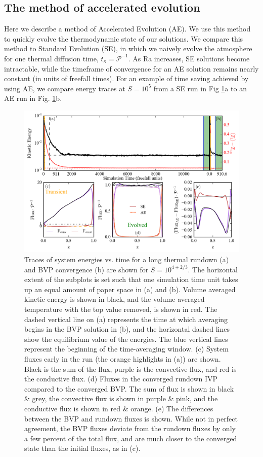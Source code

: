 \documentclass[aps, pre, onecolumn, nofootinbib, notitlepage, groupedaddress, amsfonts, amssymb, amsmath, longbibliography]{revtex4-1}
\begin{document}
\subsection{The method of accelerated evolution}
\label{subsection:ae}
Here we describe a method of Accelerated Evolution (AE). We use this method to quickly evolve the
thermodynamic state of our solutions.  We compare this method to Standard Evolution
(SE), in which we naively evolve the atmosphere for one thermal diffusion time,
$t_\kappa = \mathcal{P}^{-1}$. As Ra increases, SE solutions become intractable, 
while the timeframe of convergence for an AE solution remains nearly constant
(in units of freefall times).
For an example of time saving achieved by using AE, we compare
energy traces at $S = 10^5$ from a SE run in Fig \ref{fig:time_trace}a to an AE run
in Fig. \ref{fig:time_trace}b.

\begin{figure}[t]
\includegraphics[width=\textwidth]{./figs/time_trace.png}
\caption{Traces of system energies vs. time for a long thermal rundown (a) and BVP convergence
(b) are shown for $S = 10^{4 + 2/3}$.  The horizontal extent of the subplots is set
such that one simulation time unit takes up an equal amount of paper space in (a) and (b). Volume averaged
kinetic energy is shown in black, and the volume averaged temperature with the top value removed, is shown
in red.
The dashed vertical line on (a) represents the time at which averaging begins in the BVP solution in (b),
and the horizontal dashed lines show the equilibrium value of the energies. The blue vertical lines represent
the beginning of the time-averaging window.
(c) System fluxes early in the run (the orange highlights in (a)) are shown.  
Black is the sum of the flux, purple
is the convective flux, and red is the conductive flux.
(d) Fluxes in the converged rundown IVP compared to the converged BVP.  The sum of flux is shown in
black \& grey, the convective flux is shown in purple \& pink, and the conductive flux is shown in red \& orange.
(e) The differences between the BVP and rundown fluxes is shown.  While not in perfect agreement, 
the BVP fluxes deviate from the rundown fluxes by only a few percent of the total flux, and
are much closer to the converged state than the initial fluxes, as in (c).
\label{fig:time_trace} }
\end{figure}
\end{document}
